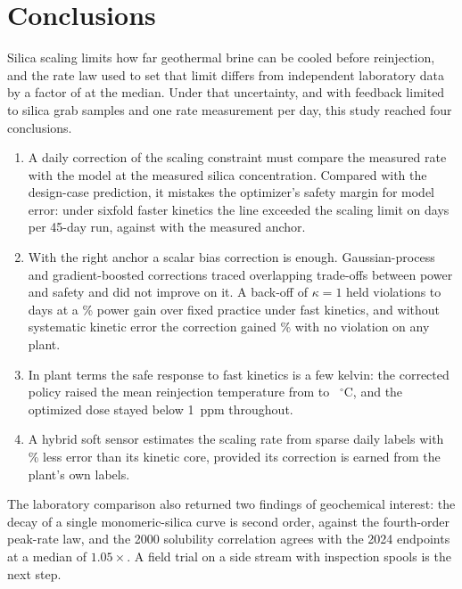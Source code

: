 \section{Conclusions}\label{sec:conclusions}

Silica scaling limits how far geothermal brine can be cooled before
reinjection, and the rate law used to set that limit differs from
independent laboratory data by a factor of  at the median.
Under that uncertainty, and with feedback limited to silica grab
samples and one rate measurement per day, this study reached four
conclusions.
\begin{enumerate}
\item A daily correction of the scaling constraint must compare the
measured rate with the model at the measured silica concentration.
Compared with the design-case prediction, it mistakes the optimizer's
safety margin for model error: under sixfold faster kinetics the line
exceeded the scaling limit on  days per 45-day run,
against  with the measured anchor.
\item With the right anchor a scalar bias correction is enough.
Gaussian-process and gradient-boosted corrections traced overlapping
trade-offs between power and safety and did not improve on it. A
back-off of $\kappa = 1$ held violations to  days at a
\% power gain over fixed practice under fast kinetics,
and without systematic kinetic error the correction gained
\% with no violation on any plant.
\item In plant terms the safe response to fast kinetics is a few
kelvin: the corrected policy raised the mean reinjection temperature
from  to ~$^{\circ}$C, and the optimized
dose stayed below 1~ppm throughout.
\item A hybrid soft sensor estimates the scaling rate from sparse daily
labels with \% less error than its kinetic core, provided
its correction is earned from the plant's own labels.
\end{enumerate}
The laboratory comparison also returned two findings of geochemical
interest: the decay of a single monomeric-silica curve is second order,
against the fourth-order peak-rate law, and the 2000 solubility
correlation agrees with the 2024 endpoints at a median of
$1.05\times$. A field trial on a side stream with inspection spools is
the next step.
